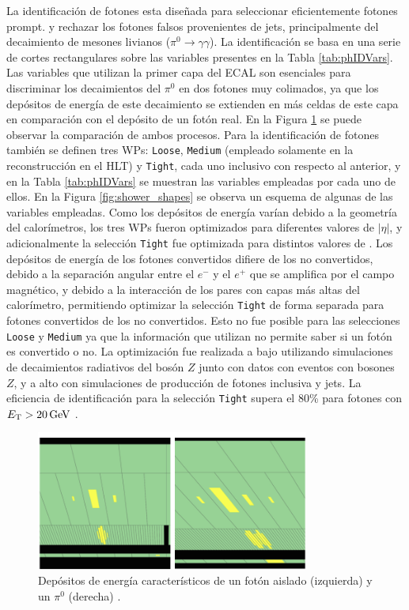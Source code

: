 La identificación de fotones esta diseñada para seleccionar eficientemente fotones prompt. y rechazar los fotones falsos provenientes de jets, principalmente del decaimiento de mesones livianos ($\pi^{0}\to\gamma\gamma$). La identificación se basa en una serie de cortes rectangulares sobre las variables presentes en la Tabla \ref{tab:phIDVars}. Las variables que utilizan la primer capa del ECAL son esenciales para discriminar los decaimientos del $\pi^{0}$ en dos fotones muy colimados, ya que los depósitos de energía de este decaimiento se extienden en más celdas de este capa en comparación con el depósito de un fotón real. En la Figura \ref{fig:phpizero} se puede observar la comparación de ambos procesos. 
Para la identificación de fotones también se definen tres WPs: \texttt{Loose}, \texttt{Medium} (empleado solamente en la reconstrucción en el HLT) y \texttt{Tight}, cada uno inclusivo con respecto al anterior, y en la Tabla \ref{tab:phIDVars} se muestran las variables empleadas por cada uno de ellos. En la Figura \ref{fig:shower_shapes} se observa un esquema de algunas de las variables empleadas.
Como los depósitos de energía varían debido a la geometría del calorímetros, los tres WPs fueron optimizados para diferentes valores de $|\eta|$, y adicionalmente la selección \texttt{Tight} fue optimizada para distintos valores de \ET. Los depósitos de energía de los fotones convertidos difiere de los no convertidos, debido a la separación angular entre el $e^-$ y el $e^+$ que se amplifica por el campo magnético, y debido a la interacción de los pares con capas más altas del calorímetro, permitiendo optimizar la selección \texttt{Tight} de forma separada para fotones convertidos de los no convertidos. Esto no fue posible para las selecciones \texttt{Loose} y \texttt{Medium} ya que la información que utilizan no permite saber si un fotón es convertido o no. La optimización fue realizada a bajo \ET utilizando simulaciones de decaimientos radiativos del bosón $Z$ junto con datos con eventos con bosones $Z$, y a alto \ET con simulaciones de producción de fotones inclusiva y jets. La eficiencia de identificación para la selección \texttt{Tight} supera el 80\% para fotones con $E_{\text{T}}>20\,\text{GeV}$ \cite{EGAM-2018-01}.

\begin{figure}
  \centering
  \includegraphics[width=0.8\textwidth]{images/objects/PhotonPizero.png}
  \caption{Depósitos de energía característicos de un fotón aislado (izquierda) y un $\pi^0$ (derecha) \cite{Wingerter-Seez:2315747}.}
  \label{fig:phpizero}
\end{figure}

